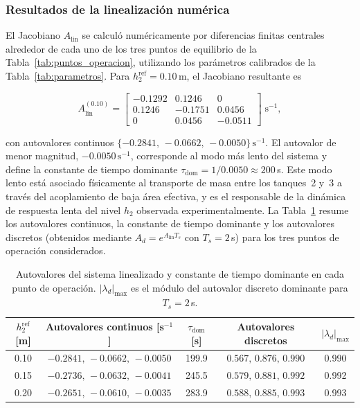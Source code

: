 \documentclass[12pt,letterpaper]{article}
\begin{document}
\subsubsection*{Resultados de la linealización numérica}

El Jacobiano $A_{\mathrm{lin}}$ se calculó numéricamente por diferencias finitas
centrales alrededor de cada uno de los tres puntos de equilibrio de la
Tabla~\ref{tab:puntos_operacion}, utilizando los parámetros calibrados de la
Tabla~\ref{tab:parametros}. Para $h_2^{\mathrm{ref}}=0.10$\,m, el Jacobiano resultante
es

\begin{equation}
A_{\mathrm{lin}}^{(0.10)} =
\begin{bmatrix}
-0.1292 &  0.1246 &  0 \\
 0.1246 & -0.1751 &  0.0456 \\
 0 &  0.0456 & -0.0511
\end{bmatrix}\;\mathrm{s}^{-1},
\end{equation}

con autovalores continuos $\{-0.2841,\,-0.0662,\,-0.0050\}\,\mathrm{s}^{-1}$. El
autovalor de menor magnitud, $-0.0050\,\mathrm{s}^{-1}$, corresponde al modo más
lento del sistema y define la constante de tiempo dominante
$\tau_{\mathrm{dom}} = 1/0.0050 \approx 200$\,s. Este modo lento está asociado
físicamente al transporte de masa entre los tanques~2 y~3 a través del acoplamiento
de baja área efectiva, y es el responsable de la dinámica de respuesta lenta del
nivel $h_2$ observada experimentalmente. La Tabla~\ref{tab:linealizacion} resume
los autovalores continuos, la constante de tiempo dominante y los autovalores
discretos (obtenidos mediante $A_d=e^{A_{\mathrm{lin}}T_s}$ con $T_s=2$\,s) para
los tres puntos de operación considerados.

\begin{table}[ht]
\centering
\caption{Autovalores del sistema linealizado y constante de tiempo dominante en
cada punto de operación. $|\lambda_d|_{\max}$ es el módulo del autovalor discreto
dominante para $T_s=2$\,s.}
\label{tab:linealizacion}
\begin{tabular}{ccccc}
\toprule
$h_2^{\mathrm{ref}}$ [m] & Autovalores continuos [s$^{-1}$] & $\tau_{\mathrm{dom}}$ [s] & Autovalores discretos & $|\lambda_d|_{\max}$ \\
\midrule
0.10 & $-0.2841,\,-0.0662,\,-0.0050$ & 199.9 & $0.567,\,0.876,\,0.990$ & 0.990 \\
0.15 & $-0.2736,\,-0.0632,\,-0.0041$ & 245.5 & $0.579,\,0.881,\,0.992$ & 0.992 \\
0.20 & $-0.2651,\,-0.0610,\,-0.0035$ & 283.9 & $0.588,\,0.885,\,0.993$ & 0.993 \\
\bottomrule
\end{tabular}
\end{table}
\end{document}
